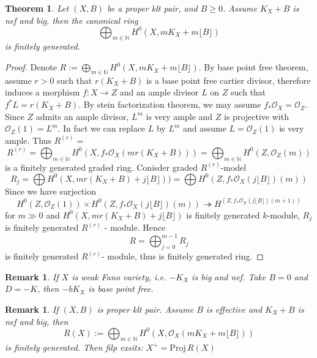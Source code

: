 \documentclass{article}
\newtheorem{thm}[defn]{Theorem}
\newtheorem{rmk}[defn]{Remark}
\begin{document}
\begin{thm}
	Let $ (X,B) $ be a proper klt pair, and $ B\geqslant 0 $. Assume $ K_X+B $ is nef and big, then the canonical ring
	$$ \bigoplus_{m\in \mathbb{N}}H^0(X,mK_X+m\lfloor B\rfloor) $$
	is finitely generated.
\end{thm}
\begin{proof}
	Denote $ R:=\bigoplus_{m\in \mathbb{N}}H^0(X,mK_X+m\lfloor B\rfloor) $. By base point free theorem, assume $ r>0 $ such that $ r(K_X+B) $ is a base point free cartier divisor, therefore induces a morphism $ f:X\to Z $ and an ample divisor $ L $ on $ Z $ such that $ f^*L=r(K_X+B) $. By stein factorization theorem, we may assume $ f_*\mathcal{O}_X=\mathcal{O}_Z $. Since $ Z $ admits an ample divisor, $ L^m $ is very ample and $ Z $ is projective with $ \mathcal{O}_Z(1)=L^m $. In fact we can replace $ L $ by $ L^m $ and assume $ L=\mathcal{O}_Z(1) $ is very ample. Thus
	$ R^{(r)}= $
	$$ R^{(r)}=\bigoplus_{m\in \mathbb{N}}H^0(X,f_*\mathcal{O}_X(mr(K_X+B)))=\bigoplus_{m\in \mathbb{N}}H^0(Z,\mathcal{O}_Z(m)) $$
	is a finitely generated graded ring. Conisder graded $ R^{(r)} $-model
	$$ R_j=\bigoplus H^0(X, mr(K_X+B)+j\lfloor B\rfloor))=\bigoplus H^0(Z, f_*\mathcal{O}_X(j\lfloor B\rfloor)(m))$$ 
	Since we have surjection
	$$ H^0(Z,\mathcal{O}_Z(1))\times H^0(Z, f_*\mathcal{O}_X(j\lfloor B\rfloor)(m))\twoheadrightarrow H^(Z, f_*\mathcal{O}_X(j\lfloor B\rfloor)(m+1)) $$
	for $ m\gg0 $ and $ H^0(X, mr(K_X+B)+j\lfloor B\rfloor) $ is finitely generated $ k $-module, $ R_j $ is finitely generated $ R^(r) $ - module. Hence 
	$$ R=\bigoplus_{j=0}^{m-1}R_j $$
	is finitely generated $ R^{(r)} $- module, thus is finitely generated ring.
\end{proof}


\begin{rmk}
	If $ X $ is weak Fano variety, i.e. $ -K_X $ is big and nef. Take $ B=0 $ and $ D=-K $, then $ -bK_X $ is base point free. 
\end{rmk}
\begin{rmk}
	If $ (X,B) $ is proper klt pair. Assume $ B $ is effective and $ K_X+B $ is nef and big, then 
	$$ R(X):=\bigoplus_{m\in \mathbb{N}}H^0(X,\mathcal{O}_X(mK_X+m\lfloor B\rfloor)) $$
	is finitely generated. Then filp exsits: $ X^+=\mathrm{Proj}\,R(X) $
\end{rmk}

\end{document}
